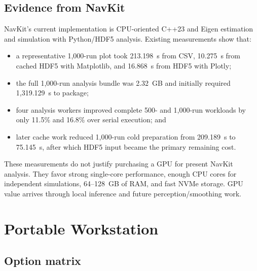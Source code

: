 \documentclass[11pt]{article}
\begin{document}
\subsection{Evidence from NavKit}

NavKit's current implementation is CPU-oriented C++23 and Eigen estimation and
simulation with Python/HDF5 analysis. Existing measurements show that:

\begin{itemize}
  \item a representative 1,000-run plot took 213.198~s from CSV, 10.275~s from
        cached HDF5 with Matplotlib, and 16.868~s from HDF5 with Plotly;
  \item the full 1,000-run analysis bundle was 2.32~GB and initially required
        1,319.129~s to package;
  \item four analysis workers improved complete 500- and 1,000-run workloads by
        only 11.5\% and 16.8\% over serial execution; and
  \item later cache work reduced 1,000-run cold preparation from 209.189~s to
        75.145~s, after which HDF5 input became the primary remaining cost.
\end{itemize}

These measurements do not justify purchasing a GPU for present NavKit
analysis. They favor strong single-core performance, enough CPU cores for
independent simulations, 64--128~GB of RAM, and fast NVMe storage. GPU value
arrives through local inference and future perception/smoothing work.

\section{Portable Workstation}

\subsection{Option matrix}
\end{document}
